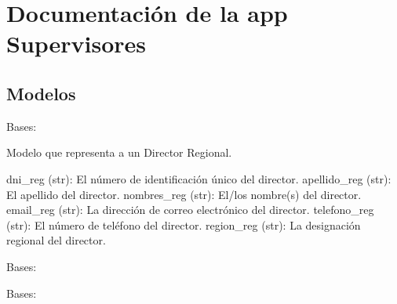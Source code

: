\documentclass[letterpaper,10pt,spanish]{sphinxmanual}
\begin{document}
\sphinxstepscope


\chapter{Documentación de la app Supervisores}
\label{\detokenize{supervisores:documentacion-de-la-app-supervisores}}\label{\detokenize{supervisores::doc}}

\section{Modelos}
\label{\detokenize{supervisores:modelos}}

\begin{fulllineitems}

\pysigstartsignatures
{}
\pysigstopsignatures
\sphinxAtStartPar
Bases: 

\sphinxAtStartPar
Modelo que representa a un Director Regional.
\begin{description}
\sphinxAtStartPar
dni\_reg (str): El número de identificación único del director.
apellido\_reg (str): El apellido del director.
nombres\_reg (str): El/los nombre(s) del director.
email\_reg (str): La dirección de correo electrónico del director.
telefono\_reg (str): El número de teléfono del director.
region\_reg (str): La designación regional del director.

\end{description}


\begin{fulllineitems}

\pysigstartsignatures
{}
\pysigstopsignatures
\sphinxAtStartPar
Bases: 

\end{fulllineitems}



\begin{fulllineitems}

\pysigstartsignatures
{}
\pysigstopsignatures
\sphinxAtStartPar
Bases: 


\end{fulllineitems}
\end{fulllineitems}
\end{document}
